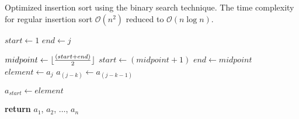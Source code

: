 \documentclass[a4paper, 12pt]{article}
\DeclarePairedDelimiter{\floor}{\lfloor}{\rfloor}
\begin{document}
	
	\begin{algorithm}

		\renewcommand{\thealgorithm}{3.1.49}
		
		\caption{Optimized insertion sort using the binary search technique. The time complexity for regular insertion sort $\mathcal{O}(n^{2})$ reduced to $\mathcal{O} (n \log n)$.}
		
		\begin{algorithmic}[1]
			
			
				\State $start \gets 1$
				\State $end \gets j$
				
				 
					\State $midpoint \gets \floor{\frac{(start + end)}{2}}$
						\State $start \gets (midpoint+1)$
					\Else
						\State $end \gets midpoint$
					\EndIf
				\EndWhile {}
				\State $element \gets a_j$
					\State $a_{(j-k)} \gets a_{(j-k-1)}$
				\EndFor
			
				\State $a_{start} \gets element$ 
				
			\EndFor
			
			\State \textbf{return} $a_1$, $a_2$, $\dots$, $a_n$
			\EndProcedure
			
		\end{algorithmic}

	\end{algorithm}
\end{document}

